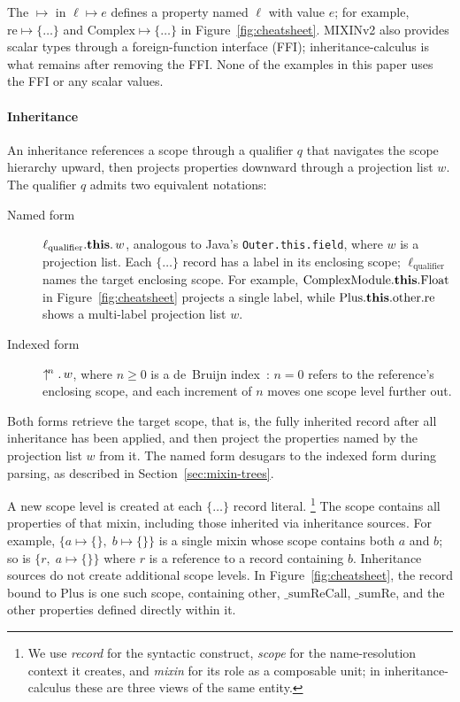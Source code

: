 The $\mapsto$ in $\ell \mapsto e$ defines a property named $\ell$ with
value $e$; for example, $\mathrm{re} \mapsto \{\ldots\}$ and
$\mathrm{Complex} \mapsto \{\ldots\}$ in Figure~\ref{fig:cheatsheet}.
MIXINv2 also provides scalar types through a
foreign-function interface (FFI); inheritance-calculus is what remains
after removing the FFI.
None of the examples in this paper uses the FFI or any scalar values.

\paragraph{Inheritance}
An inheritance references a scope through a qualifier $q$ that
navigates the scope hierarchy upward, then projects properties downward
through a projection list $w$. The qualifier $q$ admits two equivalent
notations:
\begin{description}
  \item[Named form]
    $\ell_{\mathrm{qualifier}}.\mathbf{this}.\, w$,
    analogous to Java's \texttt{Outer.this.field}, where $w$ is a
    projection list.
    Each $\{\ldots\}$ record has a label in its enclosing scope;
    $\ell_{\mathrm{qualifier}}$ names the target enclosing scope.
    For example, $\mathrm{ComplexModule}.\mathbf{this}.\mathrm{Float}$
    in Figure~\ref{fig:cheatsheet} projects a single label, while
    $\mathrm{Plus}.\mathbf{this}.\mathrm{other}.\mathrm{re}$ shows a
    multi-label projection list $w$.
  \item[Indexed form]
    $\uparrow^{\!n}.\, w$,
    where $n \ge 0$ is a de~Bruijn index~\cite{debruijn1972-nameless-dummies}:
    $n = 0$ refers to the reference's enclosing scope,
    and each increment of $n$ moves one scope level further out.
\end{description}
Both forms retrieve the target scope, that is, the fully inherited record
after all inheritance has been applied, and then project the properties
named by the projection list $w$ from it.
The named form desugars to the indexed form during parsing,
as described in Section~\ref{sec:mixin-trees}.

A new scope level is created at each $\{\ldots\}$ record literal.%
\footnote{
  We use \emph{record} for the syntactic construct, \emph{scope}
  for the name-resolution context it creates, and \emph{mixin} for its
  role as a composable unit; in inheritance-calculus these are three views
  of the same entity.
}
The scope contains all properties of that mixin, including those
inherited via inheritance sources.
For example, $\{a \mapsto \{\},\; b \mapsto \{\}\}$ is a single mixin whose scope
contains both $a$ and $b$; so is $\{r,\; a \mapsto \{\}\}$ where $r$
is a reference to a record containing $b$.
Inheritance sources do not create additional scope levels.
In Figure~\ref{fig:cheatsheet}, the record bound to $\mathrm{Plus}$ is
one such scope, containing $\mathrm{other}$, $\mathrm{\_sumReCall}$,
$\mathrm{\_sumRe}$, and the other properties defined directly within it.

